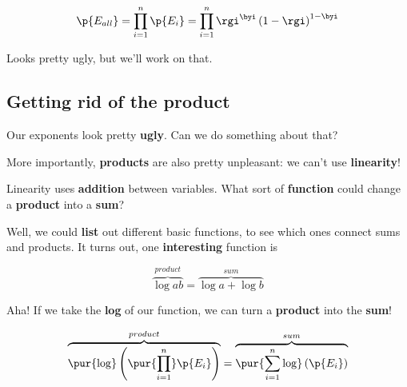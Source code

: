         \begin{equation}
            \p{E_{all}} = 
            \prod_{i = 1}^n
            \p{E_i}
            =
            \prod_{i = 1}^n
            \rgi ^ {\byi}
            \left( 
                1-\rgi 
            \right) 
            ^ { 1 - \byi }
        \end{equation}
        
        Looks pretty ugly, but we'll work on that.
        
    \subsection{Getting rid of the product}
    
        Our exponents look pretty \textbf{ugly}. Can we do something about that?
        
        More importantly, \textbf{products} are also pretty unpleasant: we can't use \textbf{linearity}! 
        
        Linearity uses \textbf{addition} between variables. What sort of \textbf{function} could change a \textbf{product} into a \textbf{sum}?
        
        Well, we could \textbf{list} out different basic functions, to see which ones connect sums and products. It turns out, one \textbf{interesting} function is
        
        \begin{equation}
            \overbrace{
                \log{ab}}
            ^{product}
            =
            \overbrace{
                \log{a} + \log{b}
            }^{sum}
        \end{equation}
        
        Aha! If we take the \textbf{log} of our function, we can turn a \textbf{product} into the \textbf{sum}!

        \begin{equation}
            \overbrace{
                \pur{\log}
                \left(
                    \pur{\prod_{i = 1}^n}
                    \p{E_i}
                \right)
            }^{product}
            =
            \overbrace{
                \pur{\sum_{i = 1}^n
                \log}
                \left(
                    \p{E_i}
                \right)
            }^{sum}
        \end{equation}
        

